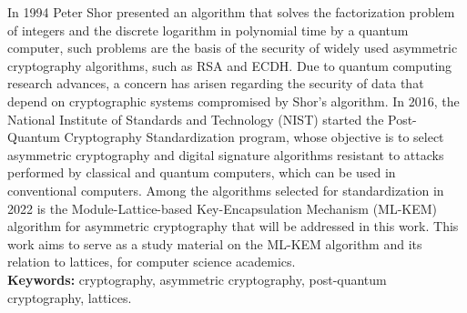 \noindent
In 1994 Peter Shor presented an algorithm that solves the factorization problem of integers and the discrete logarithm in polynomial time by a quantum computer, such problems are the basis of the security of widely used asymmetric cryptography algorithms, such as RSA and ECDH. Due to quantum computing research advances, a concern has arisen regarding the security of data that depend on cryptographic systems compromised by Shor's algorithm. In 2016, the National Institute of Standards and Technology (NIST) started the Post-Quantum Cryptography Standardization program, whose objective is to select asymmetric cryptography and digital signature algorithms resistant to attacks performed by classical and quantum computers, which can be used in conventional computers. Among the algorithms selected for standardization in 2022 is the Module-Lattice-based Key-Encapsulation Mechanism (ML-KEM) algorithm for asymmetric cryptography that will be addressed in this work. This work aims to serve as a study material on the ML-KEM algorithm and its relation to lattices, for computer science academics.\\

\noindent
\textbf{Keywords:} cryptography, asymmetric cryptography, post-quantum cryptography, lattices.